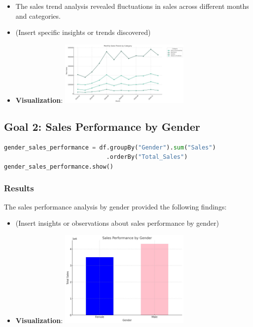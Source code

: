 \documentclass{article}
\begin{document}
\begin{itemize}
    \item The sales trend analysis revealed fluctuations in sales across different months and categories.
    \item (Insert specific insights or trends discovered)
    \item \textbf{Visualization}: \includegraphics[width=0.5\textwidth]{goal1.jpeg}
\end{itemize}



\subsection{Goal 2: Sales Performance by Gender}
\begin{lstlisting}[language=Python, caption={Sales performance analysis by gender}]
gender_sales_performance = df.groupBy("Gender").sum("Sales")
                             .orderBy("Total_Sales")
gender_sales_performance.show()
\end{lstlisting}
\subsubsection{Results}
The sales performance analysis by gender provided the following findings:

\begin{itemize}
    \item (Insert insights or observations about sales performance by gender)
     \item \textbf{Visualization}: \includegraphics[width=0.5\textwidth]{goal2.jpeg}
\end{itemize}
\end{document}
